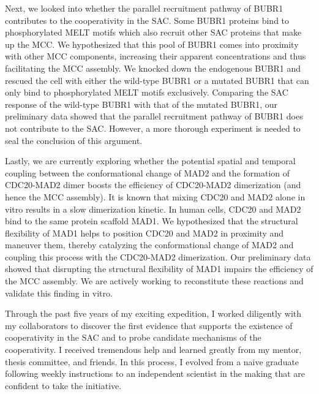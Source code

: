 Next, we looked into whether the parallel recruitment pathway of BUBR1 contributes to the cooperativity in the SAC. Some BUBR1 proteins bind to phosphorylated MELT motifs which also recruit other SAC proteins that make up the MCC. We hypothesized that this pool of BUBR1 comes into proximity with other MCC components, increasing their apparent concentrations and thus facilitating the MCC assembly. We knocked down the endogenous BUBR1 and rescued the cell with either the wild-type BUBR1 or a mutated BUBR1 that can only bind to phosphorylated MELT motifs exclusively. Comparing the SAC response of the wild-type BUBR1 with that of the mutated BUBR1, our preliminary data showed that the parallel recruitment pathway of BUBR1 does not contribute to the SAC. However, a more thorough experiment is needed to seal the conclusion of this argument.

Lastly, we are currently exploring whether the potential spatial and temporal coupling between the conformational change of MAD2 and the formation of CDC20-MAD2 dimer boosts the efficiency of CDC20-MAD2 dimerization (and hence the MCC assembly). It is known that mixing CDC20 and MAD2 alone in vitro results in a slow dimerization kinetic. In human cells, CDC20 and MAD2 bind to the same protein scaffold MAD1. We hypothesized that the structural flexibility of MAD1 helps to position CDC20 and MAD2 in proximity and maneuver them, thereby catalyzing the conformational change of MAD2 and coupling this process with the CDC20-MAD2 dimerization. Our preliminary data showed that disrupting the structural flexibility of MAD1 impairs the efficiency of the MCC assembly. We are actively working to reconstitute these reactions and validate this finding in vitro.

Through the past five years of my exciting expedition, I worked diligently with my collaborators to discover the first evidence that supports the existence of cooperativity in the SAC and to probe candidate mechanisms of the cooperativity. I received tremendous help and learned greatly from my mentor, thesis committee, and friends. In this process, I evolved from a naive graduate following weekly instructions to an independent scientist in the making that are confident to take the initiative.

